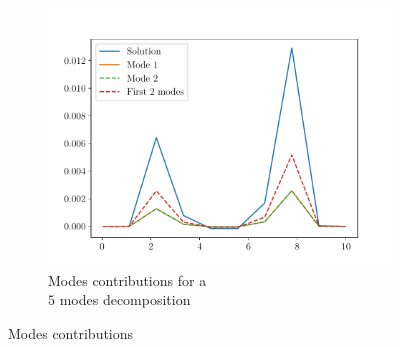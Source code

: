 \begin{figure}
\begin{subfigure}{0.3\linewidth}
        \centering
        \includegraphics[width=\linewidth]{Figures/Comp_full_fields5.pdf}
        \caption{Modes contributions for a \\$5$ modes decomposition}
    \end{subfigure}
        \caption{Modes contributions}
    \label{fig:FullFieldsModeWeight}
\end{figure}

